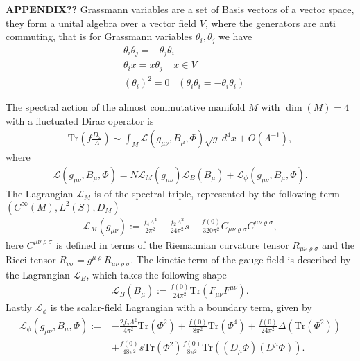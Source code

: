\textbf{APPENDIX??}
Grassmann variables are a set of Basis vectors of a vector space, they
form a unital algebra over a vector field $V$, where the generators are
anti commuting, that is for Grassmann variables $\theta _i, \theta _j$  we have
\begin{align}
    &\theta _i \theta _j = -\theta _j \theta _i \\
    &\theta _i x = x\theta _j \;\;\;\; x\in V \\
    &(\theta_i)^2 = 0 \;\;\; (\theta _i \theta _i = -\theta _i \theta _i)
\end{align}
\begin{proposition}
    The spectral action of the almost commutative manifold $M$ with $\dim(M)
    =4$ with a fluctuated Dirac operator is
    \begin{align}
        \text{Tr}(f\frac{D_\omega}{\Lambda}) \sim \int_M \mathcal{L}(g_{\mu\nu},
         B_\mu, \Phi) \sqrt{g}\ d^4x + O(\Lambda^{-1}),
    \end{align}
    where
    \begin{align}
        \mathcal{L}(g_{\mu\nu}, B_\mu, \Phi) =
        N\mathcal{L}_M(g_{\mu\nu})
        \mathcal{L}_B(B_\mu)+
        \mathcal{L}_\phi(g_{\mu\nu}, B_\mu, \Phi).
    \end{align}
    The Lagrangian $\mathcal{L}_M$ is of the spectral triple, represented by
    the following term
    $(C^\infty(M) , L^2(S), D_M)$
    \begin{align}\label{lagr}
        \mathcal{L}_M(g_{\mu\nu}) := \frac{f_4 \Lambda ^4}{2\pi^2} -
        \frac{f_2 \Lambda^2}{24\pi ^2}s - \frac{f(0)}{320\pi^2} C_{\mu\nu
        \varrho \sigma}C^{\mu\nu \varrho \sigma},
    \end{align}
    here $C^{\mu\nu \varrho \sigma}$ is defined in terms of the Riemannian
    curvature tensor $R_{\mu\nu \varrho \sigma}$ and the Ricci tensor
    $R_{\nu\sigma} = g^{\mu\varrho} R_{\mu\nu \varrho\sigma}$.
    The kinetic term of the gauge field is described by the Lagrangian
    $\mathcal{L}_B$, which takes the following shape
    \begin{align}
        \mathcal{L}_B(B_\mu) := \frac{f(0)}{24\pi^2}
        \text{Tr}(F_{\mu\nu}F^{\mu\nu}).
    \end{align}
    Lastly $\mathcal{L}_\phi$ is the scalar-field Lagrangian with a boundary
    term, given by
    \begin{align}
        \mathcal{L}_\phi(g_{\mu\nu}, B_\mu, \Phi) :=
        &-\frac{2f_2\Lambda^2}{4\pi^2}\text{Tr}(\Phi^2) + \frac{f(0)}{8\pi^2}
        \text{Tr}(\Phi^4) + \frac{f(0)}{24\pi^2} \Delta(\text{Tr}(\Phi^2))\\
        &+ \frac{f(0)}{48\pi^2}s\text{Tr}(\Phi^2)
        \frac{f(0)}{8\pi^2}\text{Tr}((D_\mu \Phi)(D^\mu \Phi)).
    \end{align}
\end{proposition}
